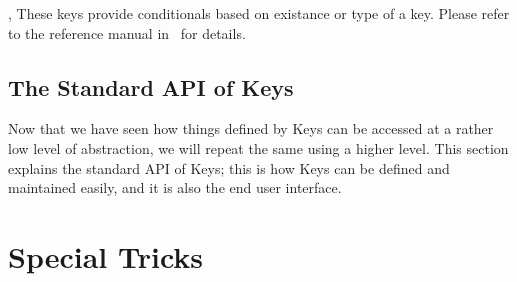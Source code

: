 \documentclass[a4paper]{ltxdoc}
\begin{document}
\begin{commandlist}{%
	\pgfkeysifdefined{},
	\pgfkeysifassignable{}}
	These keys provide conditionals based on existance or type of a key. Please refer to the reference manual in~\cite{tikz} for details.
\end{commandlist}

\subsection{The Standard API of \PGF Keys}
Now that we have seen how things defined by \PGF Keys can be accessed at a rather low level of abstraction, we will repeat the same using a higher level. This section explains the standard API of \PGF Keys; this is how Keys can be defined and maintained easily, and it is also the end user interface.









\section{Special Tricks}
\end{document}
